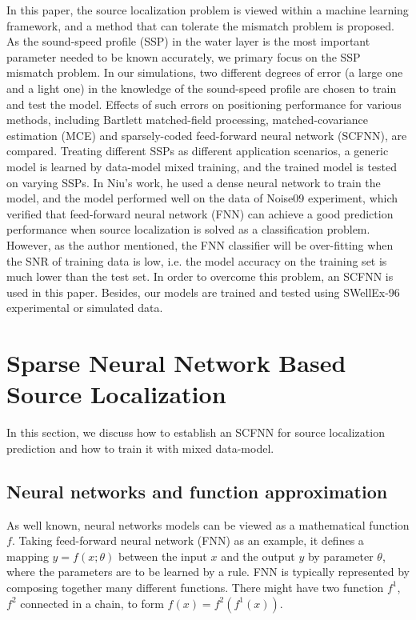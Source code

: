 In this paper, the source localization problem is viewed within a machine learning framework, and a method that can tolerate the mismatch problem is proposed.
As the sound-speed profile (SSP) in the water layer is the most important parameter needed to be known accurately\cite{feuillade1989environmental}, we primary focus on the SSP
mismatch problem.
In our simulations, two different degrees of error (a large one and a light one) in the knowledge of the sound-speed profile are chosen to train and test the model.
Effects of such errors on positioning performance for various methods, including Bartlett matched-field processing, matched-covariance estimation (MCE)\cite{zhou2013matched} and sparsely-coded feed-forward neural network (SCFNN), are compared.
Treating different SSPs as different application scenarios, a generic model is learned by data-model mixed training, and the trained model is tested on
varying SSPs.
In Niu's work\cite{niu2017source}, he used a dense neural network to train the model, and the model performed well on the data of Noise09 experiment, which verified that feed-forward neural network (FNN) can achieve a good prediction performance when source localization is solved as a classification problem. However, as the author mentioned, the FNN classifier will be over-fitting when the SNR of training data is low, i.e. the model accuracy on the training set is much lower than the test set. In order to overcome this problem,
an SCFNN is used in this paper. Besides, our models are trained and tested using SWellEx-96 experimental or simulated data.

\section{Sparse Neural Network Based Source Localization}
In this section, we discuss how to establish an SCFNN for
source localization prediction and how to train it with mixed data-model.

\subsection{Neural networks and function approximation}
As well known, neural networks models can be viewed as a mathematical function $f$. Taking feed-forward neural network (FNN) as an example, it defines a mapping ${{y}}=f(x;\theta )$ between the input $x$ and the output $y$ by parameter $\theta$, where the parameters are to be learned by a rule. FNN is typically represented by composing together many different functions. There might have two function $f^{1}$, $f^{2}$ connected in a chain\cite{goodfellow2016deep}, to form
$f(x) = f^{2}(f^{1}(x))$.

